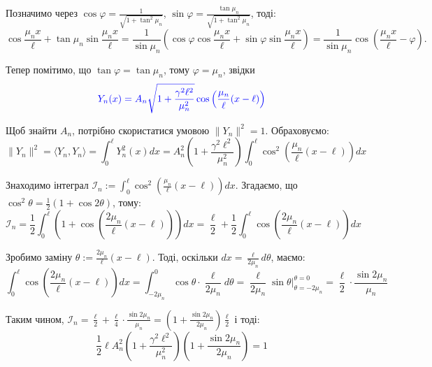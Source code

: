 \documentclass{hw_template}
\begin{document}
Позначимо через $\cos\varphi = \frac{1}{\sqrt{1+\tan^2\mu_n}}$, $\sin\varphi = \frac{\tan\mu_n}{\sqrt{1+\tan^2\mu_n}}$, тоді:
\begin{equation*}
    \cos \frac{\mu_n x}{\ell} + \tan \mu_n\sin \frac{\mu_n x}{\ell} = \frac{1}{\sin\mu_n}\left(\cos\varphi\cos \frac{\mu_n x}{\ell} + \sin\varphi\sin \frac{\mu_n x}{\ell}\right) = \frac{1}{\sin\mu_n}\cos\left(\frac{\mu_n x}{\ell} - \varphi\right).
\end{equation*}

Тепер помітимо, що $\tan\varphi = \tan\mu_n$, тому $\varphi=\mu_n$, звідки
\begin{equation*}
    \textcolor{blue}{Y_n(x) = A_n\sqrt{1+\frac{\gamma^2\ell^2}{\mu_n^2}}\cos \left(\frac{\mu_n}{\ell}(x-\ell)\right)}
\end{equation*}

Щоб знайти $A_n$, потрібно скористатися умовою $\|Y_n\|^2=1$. Обраховуємо:
\begin{equation*}
    \|Y_n\|^2 = \langle Y_n, Y_n \rangle = \int_0^{\ell} Y_n^2(x)dx = A_n^2\left(1+\frac{\gamma^2\ell^2}{\mu_n^2}\right)\int_0^{\ell}\cos^2 \left(\frac{\mu_n}{\ell}(x-\ell)\right)dx
\end{equation*}

Знаходимо інтеграл $\mathcal{I}_n := \int_0^{\ell}\cos^2 \left(\frac{\mu_n}{\ell}(x-\ell)\right)dx$. Згадаємо, що 
$\cos^2\theta = \frac{1}{2}(1+\cos 2\theta)$, тому:
\begin{equation*}
    \mathcal{I}_n = \frac{1}{2}\int_0^{\ell} \left(1+\cos\left(\frac{2\mu_n}{\ell}(x-\ell)\right)\right)dx = \frac{\ell}{2} + \frac{1}{2}\int_0^{\ell}\cos\left(\frac{2\mu_n}{\ell}(x-\ell)\right)dx
\end{equation*}

Зробимо заміну $\theta := \frac{2\mu_n}{\ell}(x-\ell)$. Тоді, оскільки $dx = \frac{\ell}{2\mu_n}d\theta$, маємо:
\begin{equation*}
    \int_0^{\ell}\cos\left(\frac{2\mu_n}{\ell}(x-\ell)\right)dx = \int_{-2\mu_n}^{0}\cos\theta \cdot \frac{\ell}{2\mu_n}d\theta = \frac{\ell}{2\mu_n}\sin\theta\Big|_{\theta=-2\mu_n}^{\theta=0} = \frac{\ell}{2}\cdot\frac{\sin 2\mu_n}{\mu_n}
\end{equation*}

Таким чином, $\mathcal{I}_n = \frac{\ell}{2} + \frac{\ell}{4} \cdot \frac{\sin 2\mu_n}{\mu_n} = \left(1+\frac{\sin 2\mu_n}{2\mu_n}\right)\frac{\ell}{2}$ і тоді:
\begin{equation*}
    \frac{1}{2}\ell A_n^2\left(1+\frac{\gamma^2\ell^2}{\mu_n^2}\right)\left(1 + \frac{\sin 2\mu_n}{2\mu_n}\right) = 1
\end{equation*}
\end{document}
